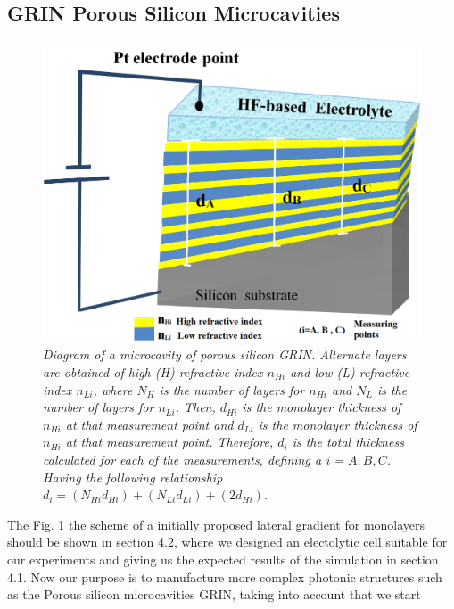 \documentclass{article}
\begin{document}
\subsection{GRIN Porous Silicon Microcavities}
\label{sec:grin-porous-silicon}
\begin{figure}
	\centering
	\includegraphics[scale=0.4]{Images/MicrGrin}
	\caption{\emph{Diagram of a microcavity of porous silicon
            GRIN. Alternate layers are obtained of high (H) refractive
            index $n_{Hi}$ and low (L) refractive index
            $n_{Li}$, where $N_H$ is the number of layers for
            $n_{Hi}$ and $N_L$ is the number of layers for
            $n_{Li}$. Then,  $d_{Hi}$ is the monolayer thickness
            of  $n_{Hi}$ at that measurement point and $d_{Li}$
            is the monolayer thickness of $n_{Hi}$ at that
            measurement point. Therefore,  $d_i$ is the total
            thickness calculated for each of the measurements,
            defining a i = $ A, B, C$. Having the following
            relationship $d_i =
            (N_{Hi}d_{Hi})+(N_{Li}d_{Li}) +
            (2d_{Hi})$. }}
	\label{fig:MCGRIN0}
\end{figure}
The Fig. \ref{fig:MCGRIN0} the scheme of  a initially proposed lateral
gradient for monolayers should be shown in section 4.2, where we
designed an electolytic cell suitable for our experiments and giving
us the expected results of the simulation in section 4.1. Now our
purpose is to manufacture more complex photonic structures such as the
Porous silicon microcavities GRIN, taking into account that we start
\end{document}
